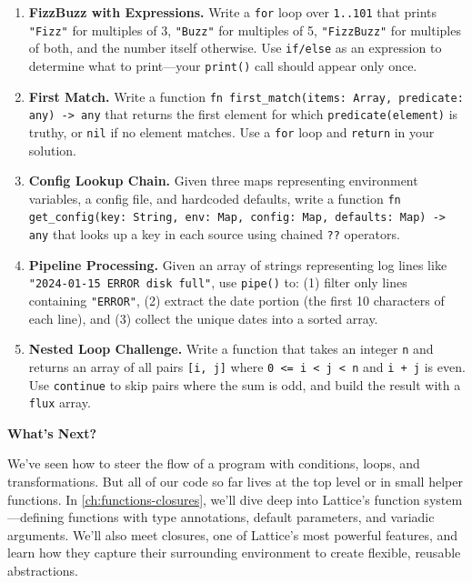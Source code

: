 \begin{enumerate}
  \item \textbf{FizzBuzz with Expressions.} Write a \lstinline|for| loop over \lstinline|1..101| that prints \lstinline|"Fizz"| for multiples of 3, \lstinline|"Buzz"| for multiples of 5, \lstinline|"FizzBuzz"| for multiples of both, and the number itself otherwise. Use \lstinline|if/else| as an expression to determine what to print---your \lstinline|print()| call should appear only once.

  \item \textbf{First Match.} Write a function \lstinline|fn first_match(items: Array, predicate: any) -> any| that returns the first element for which \lstinline|predicate(element)| is truthy, or \lstinline|nil| if no element matches. Use a \lstinline|for| loop and \lstinline|return| in your solution.

  \item \textbf{Config Lookup Chain.} Given three maps representing environment variables, a config file, and hardcoded defaults, write a function \lstinline|fn get_config(key: String, env: Map, config: Map, defaults: Map) -> any| that looks up a key in each source using chained \lstinline|??| operators.

  \item \textbf{Pipeline Processing.} Given an array of strings representing log lines like \lstinline|"2024-01-15 ERROR disk full"|, use \lstinline|pipe()| to: (1) filter only lines containing \lstinline|"ERROR"|, (2) extract the date portion (the first 10 characters of each line), and (3) collect the unique dates into a sorted array.

  \item \textbf{Nested Loop Challenge.} Write a function that takes an integer \lstinline|n| and returns an array of all pairs \lstinline|[i, j]| where \lstinline|0 <= i < j < n| and \lstinline|i + j| is even. Use \lstinline|continue| to skip pairs where the sum is odd, and build the result with a \lstinline|flux| array.
\end{enumerate}

\vspace{1em}
\noindent\textbf{What's Next?}

We've seen how to steer the flow of a program with conditions, loops, and transformations. But all of our code so far lives at the top level or in small helper functions. In \cref{ch:functions-closures}, we'll dive deep into Lattice's function system---defining functions with type annotations, default parameters, and variadic arguments. We'll also meet closures, one of Lattice's most powerful features, and learn how they capture their surrounding environment to create flexible, reusable abstractions.

